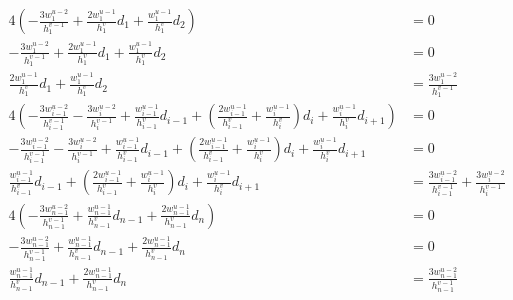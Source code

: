 \documentclass{article}
\begin{document}
\begin{align*}
  4\left(-\frac{3w_1^{u-2}}{h_1^{v-1}}+\frac{2w_1^{u-1}}{h_1^v}d_1+\frac{w_1^{u-1}}{h_1^v}d_2\right)
  &= 0 \\
  -\frac{3w_1^{u-2}}{h_1^{v-1}}+\frac{2w_1^{u-1}}{h_1^v}d_1+\frac{w_1^{u-1}}{h_1^v}d_2
  &= 0 \\
  \frac{2w_1^{u-1}}{h_1^v}d_1+\frac{w_1^{u-1}}{h_1^v}d_2
  &= \frac{3w_1^{u-2}}{h_1^{v-1}} \\
  4\left(
  -\frac{3w_{i-1}^{u-2}}{h_{i-1}^{v-1}}-\frac{3w_i^{u-2}}{h_i^{v-1}}
  +\frac{w_{i-1}^{u-1}}{h_{i-1}^v}d_{i-1}
  +\left(\frac{2w_{i-1}^{u-1}}{h_{i-1}^v}+\frac{w_i^{u-1}}{h_i^v}\right)d_i
  +\frac{w_i^{u-1}}{h_i^v}d_{i+1}
  \right)
  &= 0 \\
  -\frac{3w_{i-1}^{u-2}}{h_{i-1}^{v-1}}-\frac{3w_i^{u-2}}{h_i^{v-1}}
  +\frac{w_{i-1}^{u-1}}{h_{i-1}^v}d_{i-1}
  +\left(\frac{2w_{i-1}^{u-1}}{h_{i-1}^v}+\frac{w_i^{u-1}}{h_i^v}\right)d_i
  +\frac{w_i^{u-1}}{h_i^v}d_{i+1}
  &= 0 \\
  \frac{w_{i-1}^{u-1}}{h_{i-1}^v}d_{i-1}
  +\left(\frac{2w_{i-1}^{u-1}}{h_{i-1}^v}+\frac{w_i^{u-1}}{h_i^v}\right)d_i
  +\frac{w_i^{u-1}}{h_i^v}d_{i+1}
  &= \frac{3w_{i-1}^{u-2}}{h_{i-1}^{v-1}}+\frac{3w_i^{u-2}}{h_i^{v-1}} \\
  4\left(-\frac{3w_{n-1}^{u-2}}{h_{n-1}^{v-1}}+\frac{w_{n-1}^{u-1}}{h_{n-1}^v}d_{n-1}+\frac{2w_{n-1}^{u-1}}{h_{n-1}^v}d_n\right)
  &= 0 \\
  -\frac{3w_{n-1}^{u-2}}{h_{n-1}^{v-1}}+\frac{w_{n-1}^{u-1}}{h_{n-1}^v}d_{n-1}+\frac{2w_{n-1}^{u-1}}{h_{n-1}^v}d_n
  &= 0 \\
  \frac{w_{n-1}^{u-1}}{h_{n-1}^v}d_{n-1}+\frac{2w_{n-1}^{u-1}}{h_{n-1}^v}d_n
  &= \frac{3w_{n-1}^{u-2}}{h_{n-1}^{v-1}} \\
\end{align*}
\end{document}
